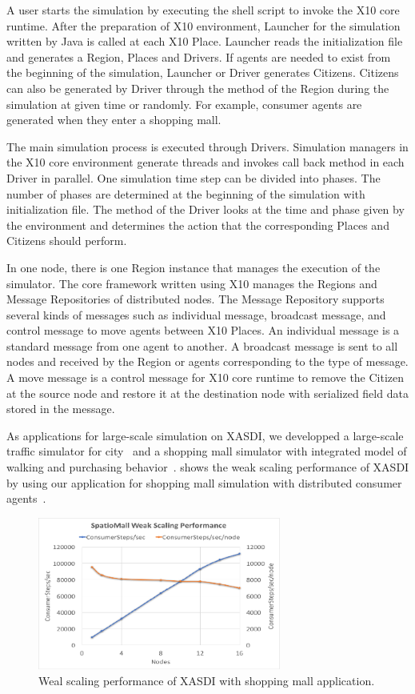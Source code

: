 A user starts the simulation by executing the shell script to invoke the X10 core runtime.
After the preparation of X10 environment, Launcher for the simulation written by Java is called at each X10 Place.
Launcher reads the initialization file and generates a Region, Places and Drivers.
If agents are needed to exist from the beginning of the simulation, Launcher or Driver generates Citizens.
Citizens can also be generated by Driver through the method of the Region during the simulation at given time or randomly. For example, consumer agents are generated when they enter a shopping mall.

The main simulation process is executed through Drivers.
Simulation managers in the X10 core environment generate threads and invokes call back method in each Driver in parallel.
One simulation time step can be divided into phases. The number of phases are determined at the beginning of the simulation with initialization file.
The method of the Driver looks at the time and phase given by the environment and determines the action that the corresponding Places and Citizens should perform.


In one node, there is one Region instance that manages the execution of the simulator.
The core framework written using X10 manages the Regions and Message Repositories of distributed nodes.
The Message Repository supports several kinds of messages such as individual message, broadcast message, and control message to move agents between X10 Places.
An individual message is a standard message from one agent to another.
A broadcast message is sent to all nodes and received by the Region or agents corresponding to the type of message.
A move message is a control message for X10 core runtime to remove the Citizen at the source node and restore it at the destination node with serialized field data stored in the message.


As applications for large-scale simulation on XASDI, we developped a large-scale traffic simulator for city~\cite{osogami2013toward} and a shopping mall simulator with integrated model of walking and purchasing behavior~\cite{mizuta2017wsc}.
 shows the weak scaling performance of XASDI by using our application for shopping mall simulation with distributed consumer agents~\cite{ppl2018takeuchi}.
\begin{figure}[h]
  \centering
  \includegraphics[width=8cm]{Figs.mizuta/xasdiscaling.pdf}
  \caption{Weal scaling performance of XASDI with shopping mall application.}
  \label{fig:Figs.mizuta/xasdiscaling}
\end{figure}
